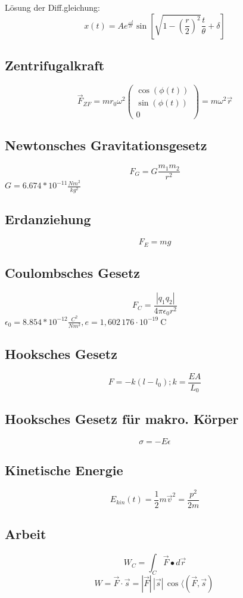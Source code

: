 \documentclass{article}
\begin{document}
\begin{multicols*}{3}
  Lösung der Diff.gleichung:
  $$x(t) = Ae^{\frac{-t}{2r}}\sin[\sqrt{1-(\frac{r}{2})^2}\frac{t}{\theta}+\delta]$$

  \subsection{Zentrifugalkraft}

  $$\vec{F}_{ZF} = m r_0\omega ^2 \begin{pmatrix} \cos(\phi(t)) \\ \sin(\phi(t)) \\ 0 \end{pmatrix} = m\omega ^2\vec{r}$$

  \subsection{Newtonsches Gravitationsgesetz}
  $$F_G= G\frac{m_1m_2}{r^2}$$
  $G = 6.674 * 10 ^{-11} \frac{Nm^2}{kg^2}$

  \subsection{Erdanziehung}
  $$F_E = mg$$

  \subsection{Coulombsches Gesetz}
  $$F_C = \frac{|q_1q_2|}{4\pi\epsilon _0 r^2}$$
  $\epsilon _0= 8.854 * 10^{-12} \frac{C^2}{Nm^2}, e=1{,}602\,176\cdot 10^{-19}\ \mathrm {C}$

  \subsection{Hooksches Gesetz}
  $$F = -k(l-l_0); k=\frac{EA}{L_0}$$

  \subsection{Hooksches Gesetz für makro. Körper}
  $$\sigma = -E\epsilon$$

  \subsection{Kinetische Energie}
  $$E_{kin}(t)= \frac{1}{2}m \vec{v}^2 = \frac{p^2}{2m}$$

  \subsection{Arbeit}
  $$W_C=\int_{C}\vec{F}\bullet d\vec{r}$$
  $${\displaystyle W={\vec {F}}\cdot {\vec {s}}=|{\vec {F}}|\,|{\vec {s}}|\,\cos \langle \left({\vec {F}},{\vec {s}}\right)\,}$$


\end{multicols*}
\end{document}
